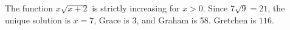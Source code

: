 The function $x\sqrt{x+2}$ is strictly increasing for $x>0$. Since $7\sqrt9=21$, the unique solution is $x=7$, Grace is 3, and Graham is 58. Gretchen is $\boxed{116}$.
